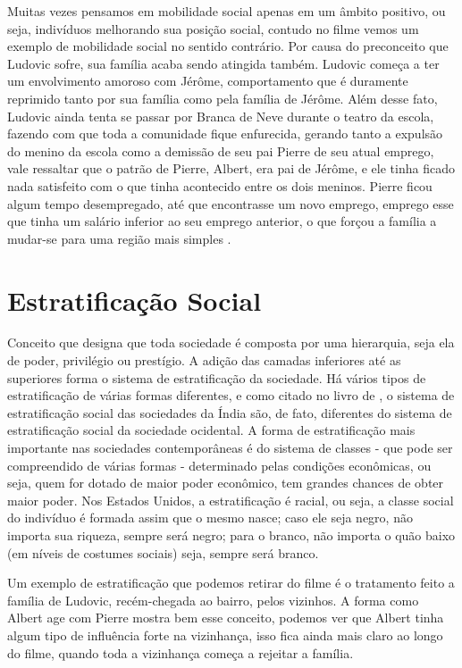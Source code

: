 \documentclass[
	12pt,				%
	openany,
	oneside,			%
	a4paper,			%
	chapter=TITLE,		%
	english,			%
	brazil				%
]{abntex2}
\begin{document}
Muitas vezes pensamos em mobilidade social apenas em um âmbito positivo, ou seja, indivíduos melhorando sua posição social, contudo no filme vemos um exemplo de mobilidade social no sentido contrário. Por causa do preconceito que Ludovic sofre, sua família acaba sendo atingida também. Ludovic começa a ter um envolvimento amoroso com Jérôme, comportamento que é duramente reprimido tanto por sua família como pela família de Jérôme. Além desse fato, Ludovic ainda tenta se passar por Branca de Neve durante o teatro da escola, fazendo com que toda a comunidade fique enfurecida, gerando tanto a expulsão do menino da escola como a demissão de seu pai Pierre de seu atual emprego, vale ressaltar que o patrão de Pierre, Albert, era pai de Jérôme, e ele tinha ficado nada satisfeito com o que tinha acontecido entre os dois meninos. Pierre ficou algum tempo desempregado, até que encontrasse um novo emprego, emprego esse que tinha um salário inferior ao seu emprego anterior, o que forçou a família a mudar-se para uma região mais simples \cite{minhaVidaEmCorDeRosa}.

\chapter{Estratificação Social}
Conceito que designa que toda sociedade é composta por uma hierarquia, seja ela de poder, privilégio ou prestígio. A adição das camadas inferiores até as superiores forma o sistema de estratificação da sociedade. Há vários tipos de estratificação de várias formas diferentes, e como citado no livro de , o sistema de estratificação social das sociedades da Índia são, de fato, diferentes do sistema de estratificação social da sociedade ocidental. A forma de estratificação mais importante nas sociedades contemporâneas é do sistema de classes - que pode ser compreendido de várias formas - determinado pelas condições econômicas, ou seja, quem for dotado de maior poder econômico, tem grandes chances de obter maior poder. Nos Estados Unidos, a estratificação é racial, ou seja, a classe social do indivíduo é formada assim que o mesmo nasce; caso ele seja negro, não importa sua riqueza, sempre será negro; para o branco, não importa o quão baixo (em níveis de costumes sociais) seja, sempre será branco.

Um exemplo de estratificação que podemos retirar do filme \cite{minhaVidaEmCorDeRosa} é o tratamento feito a família de Ludovic, recém-chegada ao bairro, pelos vizinhos. A forma como Albert age com Pierre mostra bem esse conceito, podemos ver que Albert tinha algum tipo de influência forte na vizinhança, isso fica ainda mais claro ao longo do filme, quando toda a vizinhança começa a rejeitar a família.
\end{document}
